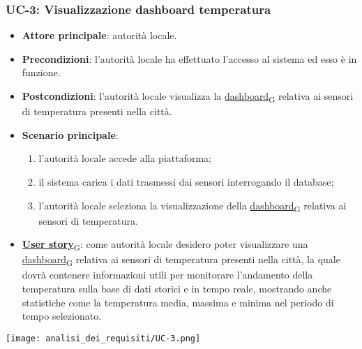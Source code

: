 \subsubsection{UC-3: Visualizzazione dashboard temperatura}
\begin{itemize}
	\item \textbf{Attore principale}: autorità locale.
	\item \textbf{Precondizioni}: l'autorità locale ha effettuato l'accesso al sistema ed esso è in funzione.
	\item \textbf{Postcondizioni}: l'autorità locale visualizza la \href{https://7last.github.io/docs/pb/documentazione-interna/glossario\#dashboard}{dashboard\textsubscript{G}} relativa
	      ai sensori di temperatura presenti nella città.
	\item \textbf{Scenario principale}:
	      \begin{enumerate}
		      \item l'autorità locale accede alla piattaforma;
		      \item il sistema carica i dati trasmessi dai sensori interrogando il database;
		      \item l'autorità locale seleziona la visualizzazione della \href{https://7last.github.io/docs/pb/documentazione-interna/glossario\#dashboard}{dashboard\textsubscript{G}} relativa ai sensori di temperatura.
	      \end{enumerate}
	\item \href{https://7last.github.io/docs/pb/documentazione-interna/glossario\#user-story}{\textbf{User story}\textsubscript{G}}:
	      come autorità locale desidero poter visualizzare una \href{https://7last.github.io/docs/pb/documentazione-interna/glossario\#dashboard}{dashboard\textsubscript{G}} relativa ai sensori di temperatura presenti nella città, la quale
	      dovrà contenere informazioni utili per monitorare l'andamento della temperatura sulla base di dati storici e in tempo reale, mostrando
	      anche statistiche come la temperatura media, massima e minima nel periodo di tempo selezionato.
\end{itemize}
\begin{center}
	\texttt{[image: analisi\_dei\_requisiti/UC-3.png]}
\end{center}


